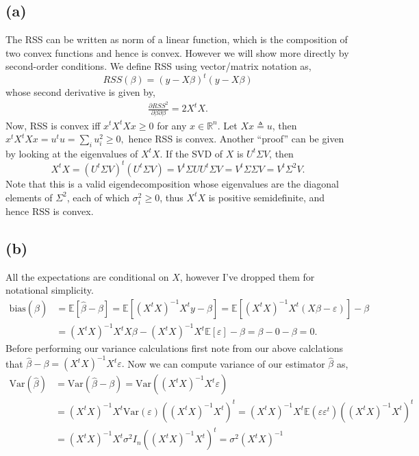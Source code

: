 \documentclass[10pt]{article}
\def\E{\mathbb{E}}
\def\Var{\text{Var}}
\begin{document}
\subsection*{(a)}
The RSS can be written as norm of a linear function, which is the composition of two convex
functions and hence is convex. However we will show more directly by second-order conditions.
We define RSS using vector/matrix notation as, \[RSS(\beta) = (y - X\beta)^t(y - X\beta)\] whose
second derivative is given by,
\begin{align*}
    \frac{\partial RSS^2}{\partial \beta \partial \beta} = 2X^t X.
\end{align*}
Now, RSS is convex iff $x^tX^tXx \geq 0$ for any $x \in \mathbb{R}^n$. Let $Xx \triangleq u$, then
$x^tX^tXx = u^t u = \sum_i u_i^2 \geq 0,$ hence RSS is convex. Another ``proof'' can be given by 
looking at the eigenvalues of $X^tX$. If the SVD of $X$ is $U^t\Sigma V$, then 
\[
    X^tX = (U^t\Sigma V)^t (U^t\Sigma V) = V^t\Sigma U U^t\Sigma V = V^t \Sigma \Sigma V = V^t \Sigma^2 V.
\] Note that this is a valid eigendecomposition whose eigenvalues are the diagonal elements of
$\Sigma^2$, each of which $\sigma^2_i \geq 0$, thus $X^tX$ is positive semidefinite, and hence RSS is convex.

\subsection*{(b)}
All the expectations are conditional on $X$, however I've dropped them for notational simplicity.
\begin{align*}
    \text{bias}(\hat{\beta}) &= \E[\hat{\beta} - \beta] = \E[(X^tX)^{-1}X^ty - \beta] = \E[(X^tX)^{-1}X^t(X\beta - \varepsilon)] - \beta \\
    &= (X^tX)^{-1}X^tX\beta - (X^tX)^{-1}X^t\E[\varepsilon] - \beta = \beta - 0 - \beta  = 0.
\end{align*}
Before performing our variance calculations first note from our above calclations that
$\hat{\beta} - \beta = (X^tX)^{-1}X^t \varepsilon.$ Now we can compute variance of our estimator
$\hat{\beta}$ as,
\begin{align*}
    \Var(\hat{\beta}) & = \Var(\hat{\beta} - \beta) = \Var((X^tX)^{-1}X^t \varepsilon) \\
    & = (X^tX)^{-1}X^t \Var(\varepsilon) ((X^tX)^{-1}X^t)^t =  (X^tX)^{-1}X^t \E(\varepsilon \varepsilon^t) ((X^tX)^{-1}X^t)^t \\
    & = (X^tX)^{-1}X^t \sigma^2 I_n ((X^tX)^{-1}X^t)^t  = \sigma^2(X^tX)^{-1}
\end{align*}
\end{document}
